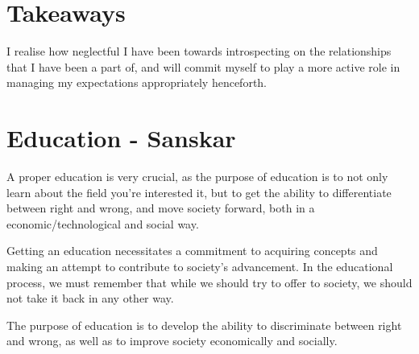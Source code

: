 \documentclass[a4paper, 12pt]{extarticle}
\begin{document}
\section*{Takeaways}
    
I realise how neglectful I have been towards introspecting on the relationships that I have been a part of, and will commit myself to play a more active role in managing my expectations appropriately henceforth.

\section*{Education - Sanskar}

A proper education is very crucial, as the purpose of education is to not only learn about the field you’re interested it, but to get the ability to differentiate between right and wrong, and move society forward, both in a economic/technological and social way.  

Getting an education necessitates a commitment to acquiring concepts and making an attempt to contribute to society's advancement. In the educational process, we must remember that while we should try to offer to society, we should not take it back in any other way.

The purpose of education is to develop the ability to discriminate
between right and wrong, as well as to improve society economically and socially.
\end{document}
